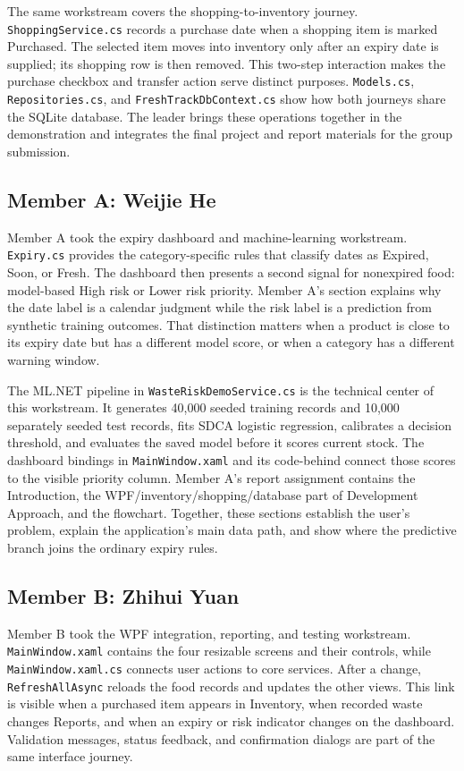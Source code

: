 \documentclass[11pt,a4paper]{article}
\begin{document}
The same workstream covers the shopping-to-inventory journey. \texttt{ShoppingService.cs} records a purchase date when a shopping item is marked Purchased. The selected item moves into inventory only after an expiry date is supplied; its shopping row is then removed. This two-step interaction makes the purchase checkbox and transfer action serve distinct purposes. \texttt{Models.cs}, \texttt{Repositories.cs}, and \texttt{FreshTrackDbContext.cs} show how both journeys share the SQLite database. The leader brings these operations together in the demonstration and integrates the final project and report materials for the group submission.

\subsection*{Member A: Weijie He}

Member A took the expiry dashboard and machine-learning workstream. \texttt{Expiry.cs} provides the category-specific rules that classify dates as Expired, Soon, or Fresh. The dashboard then presents a second signal for nonexpired food: model-based High risk or Lower risk priority. Member A's section explains why the date label is a calendar judgment while the risk label is a prediction from synthetic training outcomes. That distinction matters when a product is close to its expiry date but has a different model score, or when a category has a different warning window.

The ML.NET pipeline in \texttt{WasteRiskDemoService.cs} is the technical center of this workstream. It generates 40,000 seeded training records and 10,000 separately seeded test records, fits SDCA logistic regression, calibrates a decision threshold, and evaluates the saved model before it scores current stock. The dashboard bindings in \texttt{MainWindow.xaml} and its code-behind connect those scores to the visible priority column. Member A's report assignment contains the Introduction, the WPF/inventory/shopping/database part of Development Approach, and the flowchart. Together, these sections establish the user's problem, explain the application's main data path, and show where the predictive branch joins the ordinary expiry rules.

\subsection*{Member B: Zhihui Yuan}

Member B took the WPF integration, reporting, and testing workstream. \texttt{MainWindow.xaml} contains the four resizable screens and their controls, while \texttt{MainWindow.xaml.cs} connects user actions to core services. After a change, \texttt{RefreshAllAsync} reloads the food records and updates the other views. This link is visible when a purchased item appears in Inventory, when recorded waste changes Reports, and when an expiry or risk indicator changes on the dashboard. Validation messages, status feedback, and confirmation dialogs are part of the same interface journey.
\end{document}
